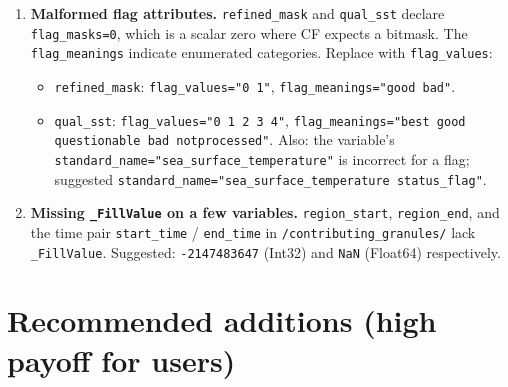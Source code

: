 \documentclass[11pt]{article}
\begin{document}
\begin{enumerate}[leftmargin=*,topsep=2pt]
  \item \textbf{Malformed flag attributes.} \texttt{refined\_mask}
    and \texttt{qual\_sst} declare \texttt{flag\_masks=0}, which
    is a scalar zero where CF expects a bitmask. The
    \texttt{flag\_meanings} indicate enumerated categories. Replace
    with \texttt{flag\_values}:
    \begin{itemize}[topsep=0pt]
      \item \texttt{refined\_mask}: \texttt{flag\_values="0 1"},
        \texttt{flag\_meanings="good bad"}.
      \item \texttt{qual\_sst}: \texttt{flag\_values="0 1 2 3 4"},
        \texttt{flag\_meanings="best good questionable bad
        notprocessed"}. Also: the variable's
        \texttt{standard\_name="sea\_surface\_temperature"} is
        incorrect for a flag; suggested
        \texttt{standard\_name="sea\_surface\_temperature status\_flag"}.
    \end{itemize}

  \item \textbf{Missing \texttt{\_FillValue} on a few variables.}
    \texttt{region\_start}, \texttt{region\_end}, and the time
    pair \texttt{start\_time} / \texttt{end\_time} in
    \texttt{/contributing\_granules/} lack
    \texttt{\_FillValue}. Suggested:
    \texttt{-2147483647} (Int32) and \texttt{NaN} (Float64)
    respectively.
\end{enumerate}

\section*{Recommended additions (high payoff for users)}
\end{document}
